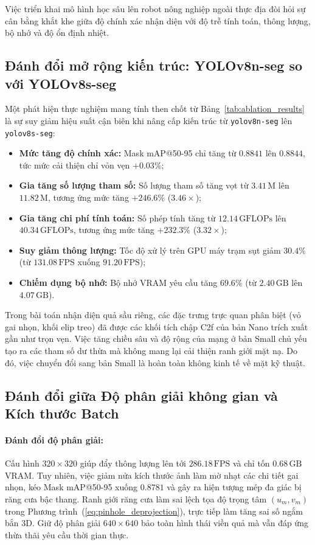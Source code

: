 \documentclass[12pt,a4paper]{article}
\begin{document}
Việc triển khai mô hình học sâu lên robot nông nghiệp ngoài thực địa đòi hỏi sự cân bằng khắt khe giữa độ chính xác nhận diện với độ trễ tính toán, thông lượng, bộ nhớ và độ ổn định nhiệt.

\subsection{Đánh đổi mở rộng kiến trúc: YOLOv8n-seg so với YOLOv8s-seg}
Một phát hiện thực nghiệm mang tính then chốt từ Bảng~\ref{tab:ablation_results} là sự suy giảm hiệu suất cận biên khi nâng cấp kiến trúc từ \texttt{yolov8n-seg} lên \texttt{yolov8s-seg}:
\begin{itemize}
    \item \textbf{Mức tăng độ chính xác:} Mask mAP@50-95 chỉ tăng từ $0.8841$ lên $0.8844$, tức mức cải thiện chỉ vỏn vẹn \textbf{$+0.03\%$};
    \item \textbf{Gia tăng số lượng tham số:} Số lượng tham số tăng vọt từ $3.41\,\text{M}$ lên $11.82\,\text{M}$, tương ứng mức tăng \textbf{$+246.6\%$} ($3.46\times$);
    \item \textbf{Gia tăng chi phí tính toán:} Số phép tính tăng từ $12.14\,\text{GFLOPs}$ lên $40.34\,\text{GFLOPs}$, tương ứng mức tăng \textbf{$+232.3\%$} ($3.32\times$);
    \item \textbf{Suy giảm thông lượng:} Tốc độ xử lý trên GPU máy trạm sụt giảm $30.4\%$ (từ $131.08\,\text{FPS}$ xuống $91.20\,\text{FPS}$);
    \item \textbf{Chiếm dụng bộ nhớ:} Bộ nhớ VRAM yêu cầu tăng $69.6\%$ (từ $2.40\,\text{GB}$ lên $4.07\,\text{GB}$).
\end{itemize}
Trong bài toán nhận diện quả sầu riêng, các đặc trưng trực quan phân biệt (vỏ gai nhọn, khối elip treo) đã được các khối tích chập C2f của bản Nano trích xuất gần như trọn vẹn. Việc tăng chiều sâu và độ rộng của mạng ở bản Small chủ yếu tạo ra các tham số dư thừa mà không mang lại cải thiện ranh giới mặt nạ. Do đó, việc chuyển đổi sang bản Small là hoàn toàn không kinh tế về mặt kỹ thuật.

\subsection{Đánh đổi giữa Độ phân giải không gian và Kích thước Batch}
\paragraph{Đánh đổi độ phân giải:}
Cấu hình $320 \times 320$ giúp đẩy thông lượng lên tới $286.18\,\text{FPS}$ và chỉ tốn $0.68\,\text{GB}$ VRAM. Tuy nhiên, việc giảm nửa kích thước ảnh làm mờ nhạt các chi tiết gai nhọn, kéo Mask mAP@50-95 xuống $0.8781$ và gây ra hiện tượng mép đa giác bị răng cưa bậc thang. Ranh giới răng cưa làm sai lệch tọa độ trọng tâm $(u_m, v_m)$ trong Phương trình~(\ref{eq:pinhole_deprojection}), trực tiếp làm tăng sai số ngắm bắn 3D. Giữ độ phân giải $640 \times 640$ bảo toàn hình thái viền quả mà vẫn đáp ứng thừa thãi yêu cầu thời gian thực.
\end{document}
